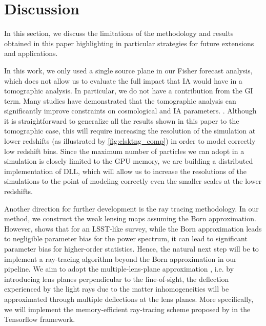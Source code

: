 \documentclass{aa}
\begin{document}
\section{Discussion}\label{Discussion}
In this section, we discuss the limitations of the methodology and results obtained in this paper highlighting in particular strategies for future extensions and  applications. 
 

In this work, we only used a single source plane in our Fisher forecast analysis, which does not allow us to evaluate the full impact that IA would have in a tomographic analysis. In particular, we do not have a contribution from the GI term. Many studies have demonstrated that the tomographic analysis can significantly improve constraints on cosmological and IA parameters.  \citep{king2003separating, heymans2004weak, troxel2015intrinsic}. Although it is straightforward to generalize all the results shown in this paper to the tomographic case, this will require increasing the resolution of the simulation at lower redshifts (as illustrated by \autoref{fig:clsktng_comp}) in order to model correctly low redshift bins. Since the maximum number of particles we can adopt in a simulation is closely limited to the GPU memory, we are building a distributed implementation of DLL, which will allow us to increase the resolutions of the simulations to the point of modeling correctly even the smaller scales at the lower redshifts.


Another direction for further development is the ray tracing methodology. In our method, we construct the weak lensing maps assuming the Born approximation. However, \cite{petri2017validity} shows that for an LSST-like survey, while the Born approximation leads to negligible parameter bias for the power spectrum, it can lead to significant parameter bias for higher-order statistics. 
Hence, the natural next step will be to implement a ray-tracing algorithm beyond the Born approximation in our pipeline.
 We aim to adopt the multiple-lens-plane approximation \citep{1986ApJ...310..568B, Stella_Seitz_1994, jain2000ray, Vale_2003, refId0}, i.e. by introducing lens planes perpendicular to the line-of-sight, the deflection experienced by the light rays due to the matter inhomogeneities will be approximated through multiple deflections at the lens planes. 
More specifically, we will implement the memory-efficient ray-tracing scheme proposed by \cite{refId0} in the Tensorflow framework.
\end{document}
